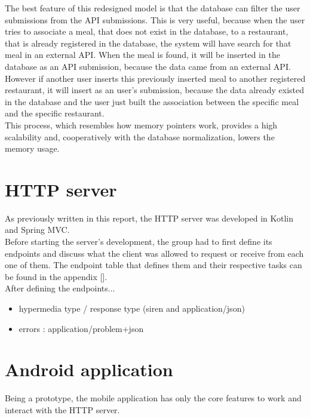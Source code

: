 The best feature of this redesigned model is that the database can filter the user submissions from the API submissions. This is very
useful, because when the user tries to associate a meal, that does not exist in the database, to a restaurant, that is already registered
in the database, the system will have search for that meal in an external API. When the meal is found, it will be inserted in the database
as an API submission, because the data came from an external API.\\

However if another user inserts this previously inserted meal to another registered restaurant, it will insert as an user's submission, because
the data already existed in the database and the user just built the association between the specific meal and the specific restaurant.\\

This process, which resembles how memory pointers work, provides a high scalability and, cooperatively with the database normalization, lowers the memory usage.

\section{HTTP server}

As previously written in this report, the HTTP server was developed in Kotlin and Spring MVC.\\

Before starting the server's development, the group had to first define its endpoints and discuss what the client was allowed to request or receive from each one of them.
The endpoint table that defines them and their respective tasks can be found in the appendix [].\\

After defining the endpoints...


\begin{itemize}
    \item hypermedia type / response type (siren and application/json)
    \item errors : application/problem+json
\end{itemize}

\section{Android application}

Being a prototype, the mobile application has only the core features to work and interact with the HTTP server.

